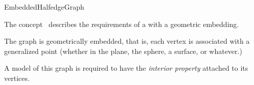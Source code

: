 
\begin{ccRefConcept}{EmbeddedHalfedgeGraph}


\ccDefinition

The concept \ccRefName\ describes the requirements of a 
with a geometric embedding.


The graph is geometrically embedded, that is, each vertex is associated with
 a generalized point (whether in the plane, the sphere, a surface, or whatever.)
 
\ccRefines
{}

A model of this graph is required to have the {\em interior property}  attached to its vertices.

\ccTypes


\ccHasModels
{}

\end{ccRefConcept}

